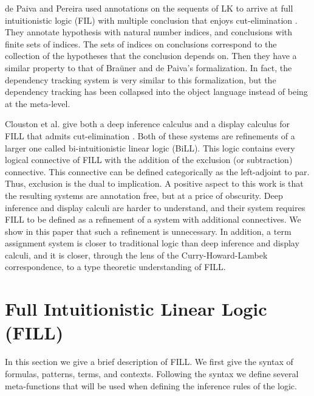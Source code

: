 de Paiva and Pereira used annotations on the sequents of LK to arrive
at full intuitionistic logic (FIL) with multiple conclusion that
enjoys cut-elimination \cite{dePaiva:2005}. They annotate hypothesis
with natural number indices, and conclusions with finite sets of
indices.  The sets of indices on conclusions correspond to the
collection of the hypotheses that the conclusion depends on.  Then
they have a similar property to that of Bra\"uner and de Paiva's
formalization.  In fact, the dependency tracking system is very
similar to this formalization, but the dependency tracking has been
collapsed into the object language instead of being at the meta-level.

Clouston et al. give both a deep inference calculus and a display
calculus for FILL that admits cut-elimination \cite{Clouston:2013}.
Both of these systems are refinements of a larger one called
bi-intuitionistic linear logic (BiLL).  This logic contains every
logical connective of FILL with the addition of the exclusion (or
subtraction) connective.  This connective can be defined categorically
as the left-adjoint to par.  Thus, exclusion is the dual to
implication.  A positive aspect to this work is that the resulting
systems are annotation free, but at a price of obscurity.  Deep
inference and display calculi are harder to understand, and their
system requires FILL to be defined as a refinement of a system with
additional connectives.  We show in this paper that such a refinement
is unnecessary.  In addition, a term assignment system is closer to
traditional logic than deep inference and display calculi, and it is
closer, through the lens of the Curry-Howard-Lambek correspondence, to
a type theoretic understanding of FILL.

\section{Full Intuitionistic Linear Logic (FILL)}
\label{sec:full_intuitionistic_linear_logic_(fill)}

In this section we give a brief description of FILL.  We first give
the syntax of formulas, patterns, terms, and contexts.  Following the
syntax we define several meta-functions that will be used when
defining the inference rules of the logic.


